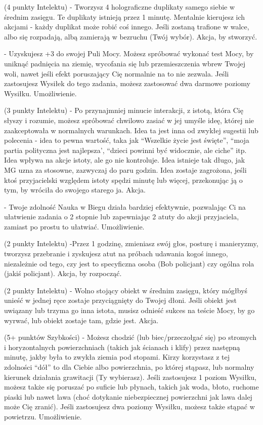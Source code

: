 { (4 punkty Intelektu) - Tworzysz 4 holograficzne duplikaty samego siebie w średnim zasięgu. Te duplikaty istnieją przez 1 minutę. Mentalnie kierujesz ich akcjami - każdy duplikat może robić coś innego. Jeśli zostaną trafione w walce, albo się rozpadają, albą zamierają w bezruchu (Twój wybór). Akcja, by stworzyć. 

 - Uzyskujesz +3 do swojej Puli Mocy. Możesz spróbować wykonać test Mocy, by uniknąć padnięcia na ziemię, wycofania się lub przemieszczenia wbrew Twojej woli, nawet jeśli efekt poruszający Cię normalnie na to nie zezwala. Jeśli zastosujesz Wysiłek do tego zadania, możesz zastosować dwa darmowe poziomy Wysiłku. Umożliwienie.

 (3 punkty Intelektu) - Po przynajmniej minucie interakcji, z istotą, która Cię słyszy i rozumie, możesz spróbować chwilowo zasiać w jej umyśle ideę, której nie zaakceptowała w normalnych warunkach. Idea ta jest inna od zwykłej sugestii lub polecenia - idea to pewna wartość, taka jak ``Wszelkie życie jest święte'', ``moja partia polityczna jest najlepsza', ``dzieci powinni być widocznie, ale ciche'' itp. Idea wpływa na akcje istoty, ale go nie kontroluje. Idea istnieje tak długo, jak MG uzna za stosowne, zazwyczaj do paru godzin. Idea zostaje zagrożona, jeśli ktoś przyjacielski względem istoty spędzi minutę lub więcej, przekonując ją o tym, by wróciła do swojego starego ja. Akcja.

 - Twoje zdolność Nauka w Biegu działa bardziej efektywnie, pozwalając Ci na ułatwienie zadania o 2 stopnie lub zapewniając 2 atuty do akcji przyjaciela, zamiast po prostu to ułatwiać. Umożliwienie. 

 (2 punkty Intelektu) -Przez 1 godzinę, zmieniasz swój głos, posturę i manieryzmy, tworzysz przebranie i zyskujesz atut na próbach udawania kogoś innego, niezależnie od tego, czy jest to specyficzna osoba (Bob policjant) czy ogólna rola (jakiś policjant). Akcja, by rozpocząć. 

 (2 punkty Intelektu) - Wolno stojący obiekt w średnim zasięgu, który mógłbyś unieść w jednej ręce zostaje przyciągnięty do Twojej dłoni. Jeśli obiekt jest uwiązany lub trzyma go inna istota, musisz odnieść sukces na teście Mocy, by go wyrwać, lub obiekt zostaje tam, gdzie jest. Akcja. 

 (5+ punktów Szybkości) - Możesz chodzić (lub biec/przeczołgać się) po stromych i horyzontalnych powierzchniach (takich jak ścianach i klify) przez następną minutę, jakby była to zwykła ziemia pod stopami. Kirzy korzystasz z tej zdolności ``dół'' to dla Ciebie albo powierzchnia, po której stąpasz, lub normalny kierunek działania grawitacji (Ty wybierasz). Jeśli zastosujesz 1 poziom Wysiłku, możesz także się poruszać po suficie lub płynach, takich jak woda, błoto, ruchome piaski lub nawet lawa (choć dotykanie niebezpiecznej powierzchni jak lawa dalej może Cię zranić). Jeśli zastosujesz dwa poziomy Wysiłku, możesz także stąpać w powietrzu. Umożliwienie.

}
